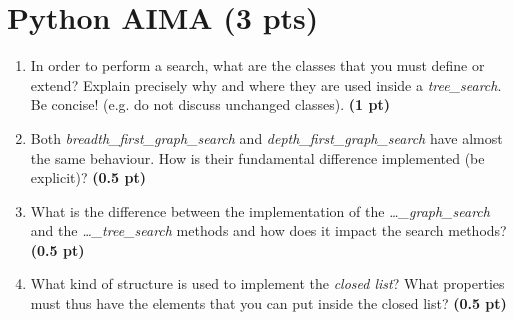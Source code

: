 \documentclass[11pt,a4paper]{report}
\begin{document}
\maketitle

\section{Python AIMA (3 pts)}

\begin{enumerate}
  \item In order to perform a search, what are the classes that you must define or extend? Explain precisely why and where they are used inside a \textit{tree\_search}. Be concise! (e.g. do not discuss unchanged classes). \textbf{(1 pt)}
\end{enumerate}

\begin{answer}
\end{answer}



\begin{enumerate}
\setcounter{enumi}{1}
    \item Both \textit{breadth\_first\_graph\_search} and \textit{depth\_first\_graph\_search} have almost the same behaviour. How is their fundamental difference implemented (be explicit)? \textbf{(0.5 pt)}
\end{enumerate}

\begin{answer}
\end{answer}



\begin{enumerate}
\setcounter{enumi}{2}
    \item What is the difference between the implementation of the \textit{\dots\_graph\_search} and the \textit{\dots\_tree\_search} methods and how does it impact the search methods? \textbf{(0.5 pt)}
\end{enumerate}

\begin{answer}
\end{answer}



\begin{enumerate}
\setcounter{enumi}{3}
    \item What kind of structure is used to implement the \textit{closed list}? 
    What properties must thus have the elements that you can
    put inside the closed list? \textbf{(0.5 pt)}
\end{enumerate}
\end{document}
